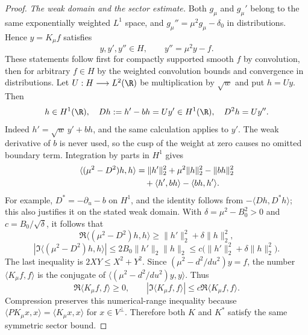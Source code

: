 \begin{proof}
\emph{The weak domain and the sector estimate.}
Both $g_\mu$ and $g_\mu'$ belong to the same exponentially weighted $L^1$ space, and
$g_\mu''=\mu^2g_\mu-\delta_0$ in distributions. Hence $y=K_\mu f$ satisfies
\[
 y,y',y''\in H,\qquad y''=\mu^2y-f.
\]
These statements follow first for compactly supported smooth $f$ by convolution, then for arbitrary $f\in H$ by the weighted convolution bounds and convergence in distributions. Let $U:H\longrightarrow L^2(\R)$ be multiplication by $\sqrt w$ and put $h=Uy$. Then
\[
 h\in H^1(\R),\quad D h:=h'-bh=Uy'\in H^1(\R),
 \quad D^2h=Uy''.
\]
Indeed $h'=\sqrt w\,y'+bh$, and the same calculation applies to $y'$. The weak derivative of $b$ is never used, so the cusp of the weight at zero causes no omitted boundary term. Integration by parts in $H^1$ gives
\begin{align*}
 \langle(\mu^2-D^2)h,h\rangle
 &=\|h'\|_2^2+\mu^2\|h\|_2^2-\|bh\|_2^2\notag\\
 &\quad+\langle h',bh\rangle-\langle bh,h'\rangle.
\end{align*}
For example, $D^*=-\partial_u-b$ on $H^1$, and the identity follows from
$-\langle Dh,D^*h\rangle$; this also justifies it on the stated weak domain. With
$\delta=\mu^2-B_0^2>0$ and $c=B_0/\sqrt\delta$, it follows that
\[
 \Re\langle(\mu^2-D^2)h,h\rangle
 \ge\|h'\|_2^2+\delta\|h\|_2^2,
\]
\[
 |\Im\langle(\mu^2-D^2)h,h\rangle|
 \le2B_0\|h'\|_2\|h\|_2
 \le c\bigl(\|h'\|_2^2+\delta\|h\|_2^2\bigr).
\]
The last inequality is $2XY\le X^2+Y^2$. Since
$(\mu^2-d^2/du^2)y=f$, the number $\langle K_\mu f,f\rangle$ is the conjugate of
$\langle(\mu^2-d^2/du^2)y,y\rangle$. Thus
\begin{equation}\label{eq:masGreensector}
 \Re\langle K_\mu f,f\rangle\ge0,
 \qquad |\Im\langle K_\mu f,f\rangle|
 \le c\Re\langle K_\mu f,f\rangle.
\end{equation}
Compression preserves this numerical-range inequality because
$\langle PK_\mu x,x\rangle=\langle K_\mu x,x\rangle$ for $x\in V^\perp$.
Therefore both $K$ and $K^*$ satisfy the same symmetric sector bound.


\end{proof}
